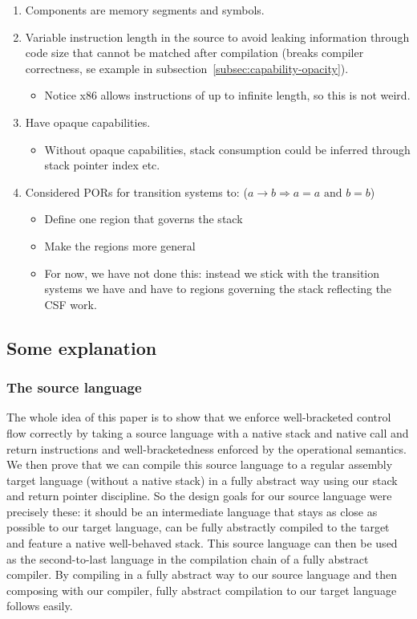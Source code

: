 \documentclass[a4paper]{article}
\begin{document}
\begin{enumerate}
\item Components are memory segments and symbols.
\item Variable instruction length in the source to avoid leaking information through code size that cannot be matched after compilation (breaks compiler correctness, se example in subsection~\ref{subsec:capability-opacity}).
  \begin{itemize}
  \item Notice x86 allows instructions of up to infinite length, so this is not weird.
  \end{itemize}
\item Have opaque capabilities.
  \begin{itemize}
  \item Without opaque capabilities, stack consumption could be inferred through stack pointer index etc.
  \end{itemize}
\item Considered PORs for transition systems to: ($a \rightarrow b \Rightarrow a = a \text{ and } b = b$)
  \begin{itemize}
  \item Define one region that governs the stack
  \item Make the regions more general
  \item For now, we have not done this: instead we stick with the transition systems we have and have to regions governing the stack reflecting the CSF work.
  \end{itemize}
\end{enumerate}

\subsection{Some explanation}
\subsubsection{The source language}
The whole idea of this paper is to show that we enforce well-bracketed control flow correctly by taking a source language with a native stack and native call and return instructions and well-bracketedness enforced by the operational semantics.
We then prove that we can compile this source language to a regular assembly target language (without a native stack) in a fully abstract way using our stack and return pointer discipline.
So the design goals for our source language were precisely these: it should be an intermediate language that stays as close as possible to our target language, can be fully abstractly compiled to the target and feature a native well-behaved stack.
This source language can then be used as the second-to-last language in the compilation chain of a fully abstract compiler.
By compiling in a fully abstract way to our source language and then composing with our compiler, fully abstract compilation to our target language follows easily.
\end{document}
